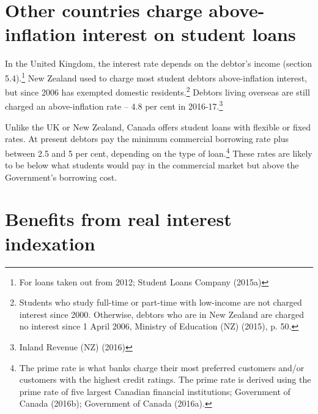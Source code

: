 \documentclass[embargoed]{grattan}
\begin{document}
\section{Other countries charge above-inflation interest on student loans}\label{other-countries-charge-above-inflation-interest-on-student-loans}

In the United Kingdom, the interest rate depends on the debtor's income (section 5.4).\footnote{For loans taken out from 2012; Student Loans Company (2015a)} New Zealand used to charge most student debtors above-inflation interest, but since 2006 has exempted domestic residents.\footnote{Students who study full-time or part-time with low-income are not charged interest since 2000. Otherwise, debtors who are in New Zealand are charged no interest since 1 April 2006, Ministry of Education (NZ) (2015), p. 50.} Debtors living overseas are still charged an above-inflation rate -- 4.8 per cent in 2016-17.\footnote{Inland Revenue (NZ) (2016)}

Unlike the UK or New Zealand, Canada offers student loans with flexible or fixed rates. At present debtors pay the minimum commercial borrowing rate plus between 2.5 and 5 per cent, depending on the type of loan.\footnote{The prime rate is what banks charge their most preferred customers and/or customers with the highest credit ratings. The prime rate is derived using the prime rate of five largest Canadian financial institutions; Government of Canada (2016b); Government of Canada (2016a).} These rates are likely to be below what students would pay in the commercial market but above the Government's borrowing cost.

\section{Benefits from real interest indexation}\label{benefits-from-real-interest-indexation}
\end{document}

